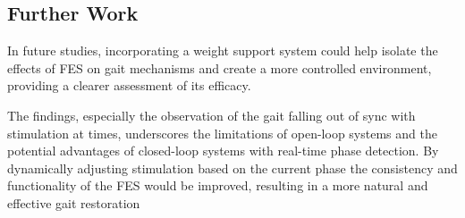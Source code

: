 \subsection{Further Work}
In future studies, incorporating a weight support system could help isolate the effects of FES on gait mechanisms and create a more controlled environment, providing a clearer assessment of its efficacy.

The findings, especially the observation of the gait falling out of sync with stimulation at times, underscores the limitations of open-loop systems and the potential advantages of closed-loop systems with real-time phase detection. By dynamically adjusting stimulation based on the current phase the consistency and functionality of the FES would be improved, resulting in a more natural and effective gait restoration




